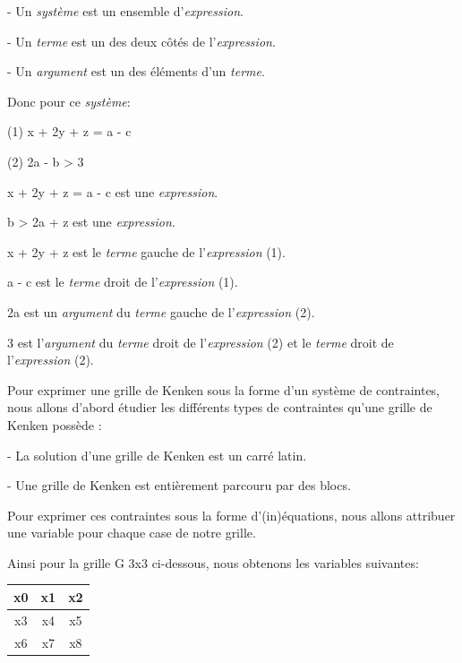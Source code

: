 \documentclass[1]{report}
\begin{document}
    - Un \textit{système} est un ensemble d'\textit{expression}.
    
    - Un \textit{terme} est un des deux côtés de l'\textit{expression}.
    
    - Un \textit{argument} est un des éléments d'un \textit{terme}. \newline

    Donc pour ce \textit{système}: \newline

    (1) x + 2y + z = a - c
    
    (2) 2a - b > 3 \newline

    x + 2y + z = a - c est une \textit{expression}.
    
    b > 2a + z est une \textit{expression}.
    
    x + 2y + z est le \textit{terme} gauche de l'\textit{expression} (1).
    
    a - c est le \textit{terme} droit de l'\textit{expression} (1).
    
    2a est un \textit{argument} du \textit{terme} gauche de l'\textit{expression} (2).
    
    3 est l'\textit{argument} du \textit{terme} droit de l'\textit{expression} (2) et le \textit{terme} droit de
    l'\textit{expression} (2). \newline

    Pour exprimer une grille de Kenken sous la forme d'un système de contraintes, nous allons d'abord étudier les différents types de contraintes qu'une grille de Kenken possède : \newline
    
    - La solution d'une grille de Kenken est un carré latin.
    
    - Une grille de Kenken est entièrement parcouru par des blocs. \newline
    
    Pour exprimer ces contraintes sous la forme d'(in)équations, nous allons attribuer une variable pour chaque case de notre grille. 
    
    Ainsi pour la grille G 3x3 ci-dessous, nous obtenons les variables suivantes: \newline

    \begin{tabular}{| c | c | c |}
        \hline
        x0 & x1 & x2 \\ \hline
        x3 & x4 & x5 \\ \hline
        x6 & x7 & x8 \\
        \hline 
    \end{tabular} \newline
    
\end{document}
